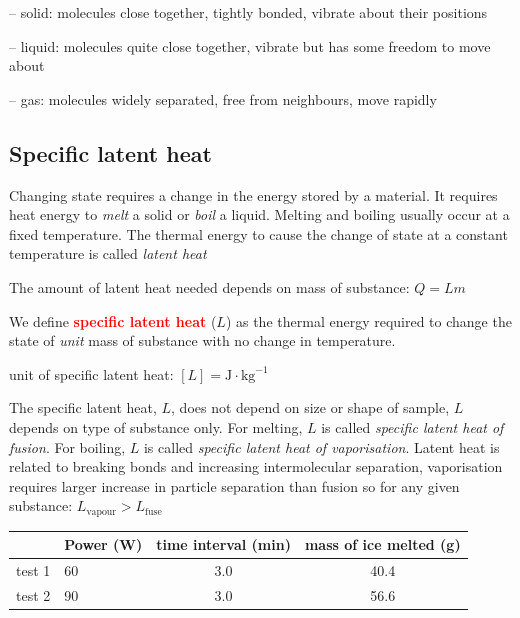 \documentclass[a4paper,12pt]{book}
\newcommand{\cmt}{}
\newenvironment{ilight}
  {\centering
  	\vspace*{6pt}
  	\begin{tcolorbox}[colframe=Gray,colback=LightGrey!15]
  \setlength{\baselineskip}{\baselineskip}%
  }
  {\end{tcolorbox}\vspace*{-4pt}}
\newcommand{\keypoint}[1]{\textbf{\textcolor{red}{#1}}}
\newcommand{\tcbhighmath}[1]{\boxed{#1}}
\newcommand{\keypoint}[1]{\textbf{\textcolor{red}{#1}}}
\newcommand{\cmt}{}
\begin{document}
\begin{compactitem}
	\item[--] solid: molecules close together, tightly bonded, vibrate about their positions
	
	\item[--] liquid: molecules quite close together, vibrate but has some freedom to move about
	
	\item[--] gas: molecules widely separated, free from neighbours, move rapidly
\end{compactitem}

\subsection{Specific latent heat}

Changing state requires a change in the energy stored by a material. It requires heat energy to \emph{melt} a solid or \emph{boil} a liquid. Melting and boiling usually occur at a fixed temperature. The thermal energy to cause the change of state at a constant temperature is called \emph{latent heat}

The amount of latent heat needed depends on mass of substance: $\tcbhighmath{Q=Lm}$

\begin{ilight}
	We define \keypoint{specific latent heat} ($L$) as the thermal energy required to change the state of \emph{unit} mass of substance with no change in temperature.
\end{ilight}

\cmt unit of specific latent heat: $[L] = \text{J}\cdot\text{kg}^{-1}$

The specific latent heat, $L$, does not depend on size or shape of sample, $L$ depends on type of substance only. For melting, $L$ is called \emph{specific latent heat of fusion}. For boiling, $L$ is called \emph{specific latent heat of vaporisation}.
Latent heat is related to breaking bonds and increasing intermolecular separation, vaporisation requires larger increase in particle separation than fusion so for any given substance: $L_\text{vapour}>L_\text{fuse}$

	

 

\begin{center}
	\begin{tabular}{|C{1.6cm}|C{2cm}|c|c|}
		\hline  & Power (W) & time interval (min) & mass of ice melted (g) \\ 
		\hline test 1 & 60 & 3.0 & 40.4 \\ 
		\hline test 2 & 90 & 3.0 & 56.6 \\ 
		\hline 
	\end{tabular} 
\end{center}
\end{document}
